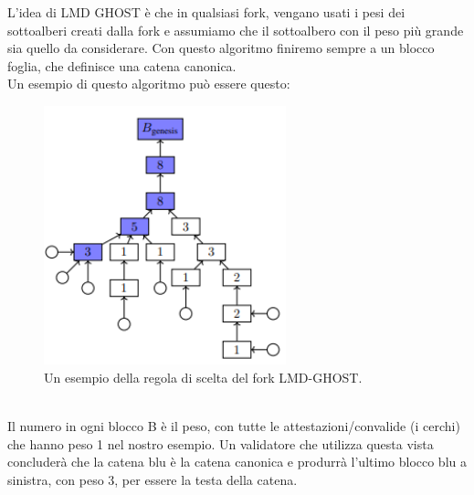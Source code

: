 \documentclass[a4paper,11pt]{report}
\begin{document}
\newpage
L'idea di LMD GHOST è che in qualsiasi fork, vengano usati i pesi dei sottoalberi creati dalla fork e assumiamo che il sottoalbero con il peso più grande sia quello da considerare. 
Con questo algoritmo finiremo sempre a un blocco foglia, che definisce una catena canonica.\\
Un esempio di questo algoritmo può essere questo:\\
\begin{figure}[htbp] 
\begin{center}
\includegraphics[width=7cm]{img/esGHOST.png}
\end{center}
\caption{Un esempio della regola di scelta del fork LMD-GHOST.}
\end{figure}
\\Il numero in ogni blocco B è il peso, con tutte le attestazioni/convalide (i cerchi) che hanno peso 1 nel nostro esempio. Un validatore che utilizza questa vista concluderà che la catena blu è la catena canonica e produrrà l'ultimo blocco blu a sinistra, con peso 3, per essere la testa della catena.
\newpage
\end{document}
